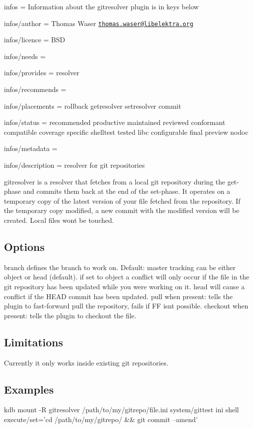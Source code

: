 
\begin{DoxyItemize}
\item infos = Information about the gitresolver plugin is in keys below
\item infos/author = Thomas Waser \href{mailto:thomas.waser@libelektra.org}{\tt thomas.\+waser@libelektra.\+org}
\item infos/licence = B\+SD
\item infos/needs =
\item infos/provides = resolver
\item infos/recommends =
\item infos/placements = rollback getresolver setresolver commit
\item infos/status = recommended productive maintained reviewed conformant compatible coverage specific shelltest tested libc configurable final preview nodoc
\item infos/metadata =
\item infos/description = resolver for git repositories
\end{DoxyItemize}

gitresolver is a resolver that fetches from a local git repository during the get-\/phase and commits them back at the end of the set-\/phase. It operates on a temporary copy of the latest version of your file fetched from the repository. If the temporary copy modified, a new commit with the modified version will be created. Local files won\textquotesingle{}t be touched.

\subsection*{Options}

{\ttfamily branch} defines the branch to work on. Default\+: master {\ttfamily tracking} can be either {\ttfamily object} or {\ttfamily head} (default). if set to {\ttfamily object} a conflict will only occur if the file in the git repository has been updated while you were working on it. {\ttfamily head} will cause a conflict if the {\ttfamily H\+E\+AD} commit has been updated. {\ttfamily pull} when present\+: tells the plugin to fast-\/forward pull the repository, fails if FF isn\textquotesingle{}t possible. {\ttfamily checkout} when present\+: tells the plugin to checkout the file.

\subsection*{Limitations}

Currently it only works inside existing git repositories.

\subsection*{Examples}

\begin{DoxyVerb}kdb mount -R gitresolver /path/to/my/gitrepo/file.ini system/gittest ini shell execute/set='cd /path/to/my/gitrepo/ && git commit --amend'\end{DoxyVerb}
 